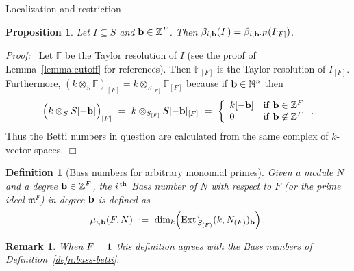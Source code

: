 \documentclass[12pt,leqno]{article}
\newtheorem{defn}[thm]{Definition}
\newtheorem{prop}[thm]{Proposition}
\newtheorem{remark}[thm]{Remark}
\def\eext{{{\underline{\rm Ext}}{\scriptscriptstyle \,}}}
\def\bb{{{\rm \bf b}}}
\def\mm{{\mathfrak m}}
\def\FF{{\mathbb F}}
\def\NN{{\mathbb N}}
\def\ZZ{{\mathbb Z}}
\begin{document}
\begin{section}{Localization and restriction}
\begin{prop} \label{prop:restriction}
Let $I \subseteq S$ and $\bb \in \ZZ^F$.  Then $\beta_{i,\bb}(I^{\,}) =
\beta_{i,\bb \cdot F}(I_{[F]})$.
\end{prop}
{\it Proof:\ } Let $\FF$ be the Taylor resolution of $I$ (see the proof
of Lemma~\ref{lemma:cutoff} for references).  Then $\FF_{[F]}$ is the
Taylor resolution of $I_{[F]}$.  Furthermore, $(k \otimes_S \FF)_{[F]} =
k \otimes_{S_{[F]}} \FF_{[F]}$ because if $\bb \in \NN^n$ then
$$
  \Bigl(k \otimes_S S[-\bb]\Bigr)_{[F]}
  \ = \ 
  k \otimes_{S_{[F]}} S[-\bb]_{[F]}
  \  = \ 
  \left\{\begin{array}{ll}
	k[-\bb]	& {\rm if}\ \bb \in \ZZ^F \cr
	0	& {\rm if}\ \bb \not\in \ZZ^F \cr
	\end{array}\right..
$$
Thus the Betti numbers in question are calculated from the same complex
of $k$-vector spaces.
%
\hfill
$\Box$

\begin{defn}[Bass numbers for arbitrary monomial primes] \label{defn:bass}
Given a module $N$ and a degree $\bb \in \ZZ^F$, the \emph{$i^{\rm \,th}$
Bass number of $N$ with respect to $F$ (or the prime ideal $\mm^{F}$) in
degree $\bb$} is defined as
$$
  \mu_{i,\bb}(F,N)\ :=\ \dim_k \Bigl(
  \eext_{S_{(F)}}^i(k,N_{(F)})_\bb \Bigr)\,.
$$
\end{defn}
\begin{remark} \rm
When $F = {\bf 1}$ this definition agrees with the Bass numbers of
Definition~\ref{defn:bass-betti}.
\end{remark}


\end{section}
\end{document}

